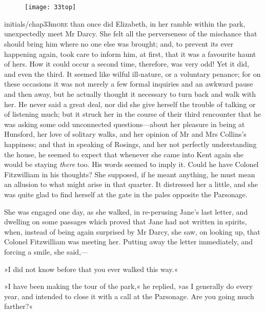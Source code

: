 \chapter[Chapter \thechapter]{}
	
	\begin{figure}[t!]
\centering
\texttt{[image: 33top]}
\end{figure}


\lettrine[lines=6,image=true]{initials/chap33m}{ore}  than once did Elizabeth, in her ramble within the park, unexpectedly meet Mr Darcy. She felt all the perverseness of the mischance that should bring him where no one else was brought; and, to prevent its ever happening again, took care to inform him, at first, that it was a favourite haunt of hers. How it could occur a second time, therefore, was very odd! Yet it did, and even the third. It seemed like wilful ill-nature, or a voluntary penance; for on these occasions it was not merely a few formal inquiries and an awkward pause and then away, but he actually thought it necessary to turn back and walk with her. He never said a great deal, nor did she give herself the trouble of talking or of listening much; but it struck her in the course of their third rencounter that he was asking some odd unconnected questions—about her pleasure in being at Hunsford, her love of solitary walks, and her opinion of Mr and Mrs Collins's happiness; and that in speaking of Rosings, and her not perfectly understanding the house, he seemed to expect that whenever she came into Kent again she would be staying \textit{there} too. His words seemed to imply it. Could he have Colonel Fitzwilliam in his thoughts? She supposed, if he meant anything, he must mean an allusion to what might arise in that quarter. It distressed her a little, and she was quite glad to find herself at the gate in the pales opposite the Parsonage.

She was engaged one day, as she walked, in re-perusing Jane's last letter, and dwelling on some passages which proved that Jane had not written in spirits, when, instead of being again surprised by Mr Darcy, she saw, on looking up, that Colonel Fitzwilliam was meeting her. Putting away the letter immediately, and forcing a smile, she said,—

»I did not know before that you ever walked this way.«

»I have been making the tour of the park,« he replied, »as I generally do every year, and intended to close it with a call at the Parsonage. Are you going much farther?«

